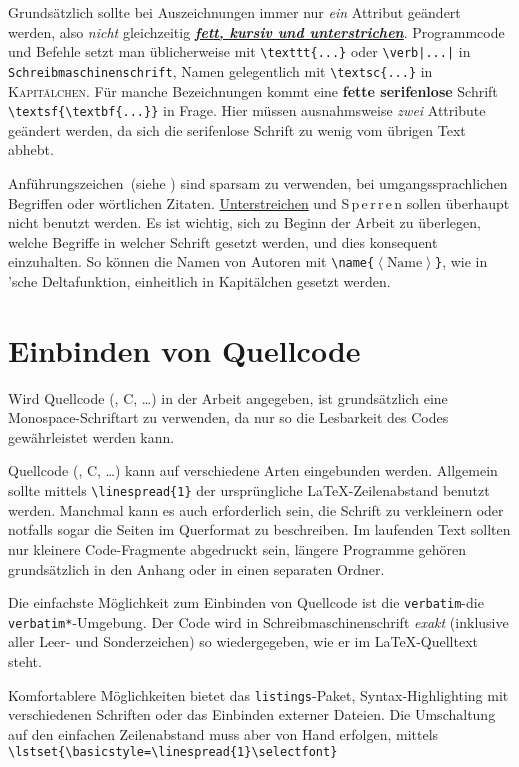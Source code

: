 Grundsätzlich sollte bei Auszeichnungen immer nur \emph{ein} Attribut geändert werden, also \emph{nicht} gleichzeitig \emph{\underline{\textbf{fett, kursiv und
unterstrichen}}}.
Programmcode und Befehle setzt man üblicherweise mit \verb|\texttt{...}| oder \verb+\verb|...|+ in \texttt{Schreibmaschinenschrift}, Namen gelegentlich mit \verb|\textsc{...}| in \textsc{Kapitälchen}.
Für manche Bezeichnungen kommt eine \textsf{\textbf{fette serifenlose}} Schrift \verb|\textsf{\textbf{...}}| in Frage.
Hier müssen ausnahmsweise \emph{zwei} Attribute geändert werden, da sich die \textsf{serifenlose} Schrift zu wenig vom übrigen Text abhebt.

\glqq Anführungszeichen\grqq\ (siehe ) sind sparsam zu verwenden, \zB bei umgangssprachlichen Begriffen oder wörtlichen Zitaten.
\underline{Unterstreichen} und \mbox{S\,p\,e\,r\,r\,e\,n} sollen überhaupt nicht benutzt werden.
Es ist wichtig, sich zu Beginn der Arbeit zu überlegen, welche Begriffe in welcher Schrift gesetzt werden, und dies konsequent einzuhalten.
So können \bspw die Namen von Autoren mit \texttt{\textbackslash{}name\{$\left\langle\text{Name}\right\rangle$\}}, wie in 'sche Deltafunktion, einheitlich in Kapitälchen gesetzt werden.


\section{Einbinden von Quellcode}
Wird Quellcode (\Matlab{}, C, \ldots) in der Arbeit angegeben, ist grundsätzlich eine Monospace-Schriftart zu verwenden, da nur so die Lesbarkeit des Codes
gewährleistet werden kann.

Quellcode (\Matlab{}, C, \ldots) kann auf verschiedene Arten eingebunden werden.
Allgemein sollte mittels \verb|\linespread{1}| der ursprüngliche \LaTeX-Zeilenabstand benutzt werden.
Manchmal kann es auch erforderlich sein, die Schrift zu verkleinern oder notfalls sogar die Seiten im Querformat zu beschreiben.
Im laufenden Text sollten nur kleinere Code-Fragmente abgedruckt sein, längere Programme gehören grundsätzlich in den Anhang oder in einen separaten Ordner.

Die einfachste Möglichkeit zum Einbinden von Quellcode ist die \verb|verbatim|-\bzw die \verb|verbatim*|-Umgebung.
Der Code wird in Schreibmaschinenschrift \emph{exakt} (inklusive aller Leer- und Sonderzeichen) so wiedergegeben, wie er im \LaTeX-Quelltext steht.

Komfortablere Möglichkeiten bietet das \verb|listings|-Paket, \zB Syntax-Highlighting mit verschiedenen Schriften oder das Einbinden externer Dateien.
Die Umschaltung auf den einfachen Zeilenabstand muss aber von Hand erfolgen, \zB mittels\\[\parskip]
\hspace*{2em}\verb|\lstset{\basicstyle=\linespread{1}\selectfont}|


